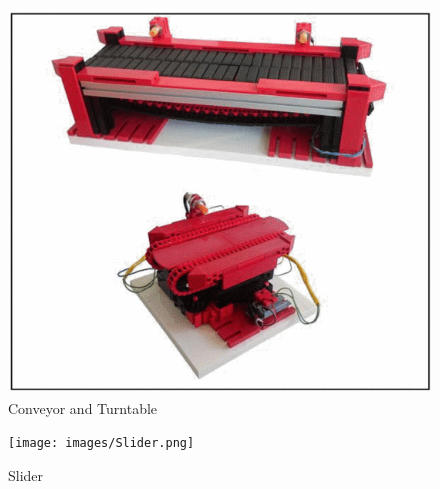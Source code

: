 \begin{figure}
    \centering
    \includegraphics[scale=0.5]{images/TT_Conv.png}
    \caption{Conveyor and Turntable \cite{Karri_2021}}
    \label{fig:tt_con}
\end{figure}

\begin{figure}
    \centering
    \texttt{[image: images/Slider.png]}
    \caption{Slider}
    \label{fig:slider}
\end{figure}

